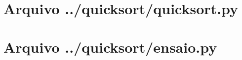 \documentclass[12pt,a4paper,twoside]{report}
\begin{document}
\clearpage
\clearpage
{}
\appendix

\chapter{Arquivo ../quicksort/quicksort.py \label{ap:quicksort}}


\chapter{Arquivo ../quicksort/ensaio.py \label{ap:quicksortensaio}}

\end{document}
